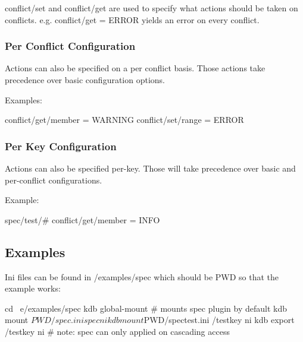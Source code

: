 {\ttfamily conflict/set} and {\ttfamily conflict/get} are used to specify what actions should be taken on conflicts. e.\+g. {\ttfamily conflict/get = E\+R\+R\+OR} yields an error on every conflict.

\subsubsection*{Per Conflict Configuration}

Actions can also be specified on a per conflict basis. Those actions take precedence over basic configuration options.

Examples\+: \begin{DoxyVerb}conflict/get/member = WARNING
conflict/set/range = ERROR
\end{DoxyVerb}


\subsubsection*{Per Key Configuration}

Actions can also be specified per-\/key. Those will take precedence over basic and per-\/conflict configurations.

Example\+: \begin{DoxyVerb}spec/test/#
    conflict/get/member = INFO
\end{DoxyVerb}


\subsection*{Examples}

Ini files can be found in /examples/spec which should be P\+WD so that the example works\+: \begin{DoxyVerb}cd ~e/examples/spec
kdb global-mount        # mounts spec plugin by default
kdb mount $PWD/spec.ini spec ni
kdb mount $PWD/spectest.ini /testkey ni
kdb export /testkey ni     # note: spec can only applied on cascading access
\end{DoxyVerb}



